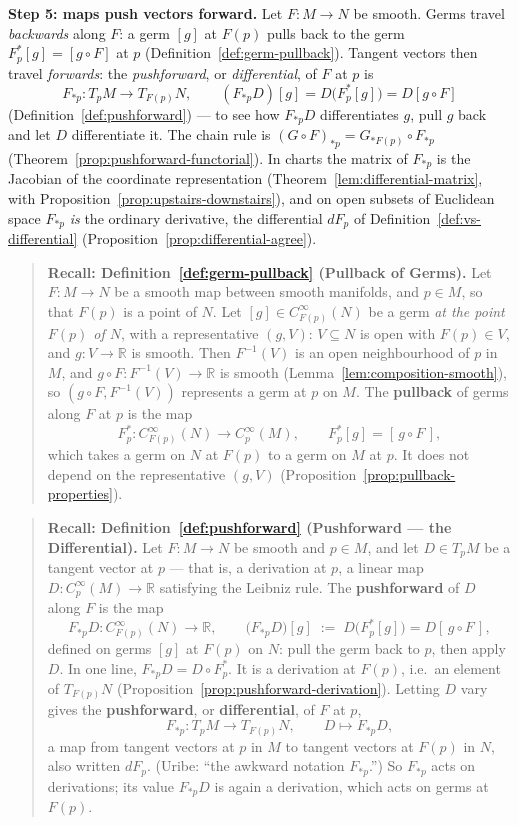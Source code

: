 \documentclass[11pt]{report}
\begin{document}
\textbf{Step 5: maps push vectors forward.} Let $F : M \to N$ be smooth. Germs travel \emph{backwards} along $F$: a germ $[g]$ at $F(p)$ pulls back to the germ $F_p^*[g] = [g \circ F]$ at $p$ (Definition~\ref{def:germ-pullback}). Tangent vectors then travel \emph{forwards}: the \emph{pushforward}, or \emph{differential}, of $F$ at $p$ is
\[
F_{*p} : T_pM \to T_{F(p)}N, \qquad (F_{*p}D)[g] = D\big(F_p^*[g]\big) = D[g \circ F]
\]
(Definition~\ref{def:pushforward}) --- to see how $F_{*p}D$ differentiates $g$, pull $g$ back and let $D$ differentiate it. The chain rule is $(G \circ F)_{*p} = G_{*F(p)} \circ F_{*p}$ (Theorem~\ref{prop:pushforward-functorial}). In charts the matrix of $F_{*p}$ is the Jacobian of the coordinate representation (Theorem~\ref{lem:differential-matrix}, with Proposition~\ref{prop:upstairs-downstairs}), and on open subsets of Euclidean space $F_{*p}$ \emph{is} the ordinary derivative, the differential $dF_p$ of Definition~\ref{def:vs-differential} (Proposition~\ref{prop:differential-agree}).

\begin{quote}
\textbf{Recall: Definition~\ref{def:germ-pullback} (Pullback of Germs).} Let $F : M \to N$ be a smooth map between smooth manifolds, and $p \in M$, so that $F(p)$ is a point of $N$. Let $[g] \in C^\infty_{F(p)}(N)$ be a germ \emph{at the point $F(p)$ of $N$}, with a representative $(g, V)$: $V \subseteq N$ is open with $F(p) \in V$, and $g : V \to \mathbb{R}$ is smooth. Then $F^{-1}(V)$ is an open neighbourhood of $p$ in $M$, and $g \circ F : F^{-1}(V) \to \mathbb{R}$ is smooth (Lemma~\ref{lem:composition-smooth}), so $(g \circ F, F^{-1}(V))$ represents a germ at $p$ on $M$. The \textbf{pullback} of germs along $F$ at $p$ is the map
\[
F_p^* : C^\infty_{F(p)}(N) \longrightarrow C^\infty_p(M), \qquad F_p^*[g] = [\,g \circ F\,],
\]
which takes a germ on $N$ at $F(p)$ to a germ on $M$ at $p$. It does not depend on the representative $(g, V)$ (Proposition~\ref{prop:pullback-properties}).
\end{quote}

\begin{quote}
\textbf{Recall: Definition~\ref{def:pushforward} (Pushforward --- the Differential).} Let $F : M \to N$ be smooth and $p \in M$, and let $D \in T_pM$ be a tangent vector at $p$ --- that is, a derivation at $p$, a linear map $D : C^\infty_p(M) \to \mathbb{R}$ satisfying the Leibniz rule. The \textbf{pushforward} of $D$ along $F$ is the map
\[
F_{*p}D : C^\infty_{F(p)}(N) \longrightarrow \mathbb{R}, \qquad \big(F_{*p}D\big)[g] \;:=\; D\big(F_p^*[g]\big) = D[\,g \circ F\,],
\]
defined on germs $[g]$ at $F(p)$ on $N$: pull the germ back to $p$, then apply $D$. In one line, $F_{*p}D = D \circ F_p^*$. It is a derivation at $F(p)$, i.e.\ an element of $T_{F(p)}N$ (Proposition~\ref{prop:pushforward-derivation}). Letting $D$ vary gives the \textbf{pushforward}, or \textbf{differential}, of $F$ at $p$,
\[
F_{*p} : T_pM \longrightarrow T_{F(p)}N, \qquad D \longmapsto F_{*p}D,
\]
a map from tangent vectors at $p$ in $M$ to tangent vectors at $F(p)$ in $N$, also written $dF_p$. (Uribe: ``the awkward notation $F_{*p}$.'') So $F_{*p}$ acts on derivations; its value $F_{*p}D$ is again a derivation, which acts on germs at $F(p)$.
\end{quote}
\end{document}
